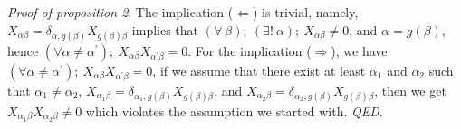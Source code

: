 \documentclass[a4paper,11pt,accepted=2024-09-14]{quantumarticle}
\newcommand{\+}         {\dagger}
\begin{document}
\textit{Proof of proposition 2}: The implication ($\Leftarrow$) is trivial, namely, $X_{\alpha\beta}=\delta_{\alpha, g(\beta)} X_{g(\beta)\beta}$ implies that $(\forall \ \beta); \ (\exists! \ \alpha); \ X_{\alpha \beta} \neq 0$, and $\alpha=g(\beta)$, hence $(\forall \alpha \neq \alpha^{\prime}); \ X_{\alpha \beta} X_{\alpha^{\prime} \beta}=0$. For the implication ($\Rightarrow$), we have $(\forall \alpha \neq \alpha^{\prime}); \ X_{\alpha \beta} X_{\alpha^{\prime} \beta}=0$, if we assume that there exist at least $\alpha_1$ and $\alpha_2$ such that $\alpha_1 \neq \alpha_2$, $X_{\alpha_1 \beta} =\delta_{\alpha_1, g(\beta)} X_{g(\beta)\beta}$, and $X_{\alpha_2 \beta} =\delta_{\alpha_2, g(\beta)} X_{g(\beta)\beta}$, then we get $X_{\alpha_1 \beta}X_{\alpha_2 \beta} \neq 0$ which violates the assumption we started with. \textit{QED}.
\end{document}
